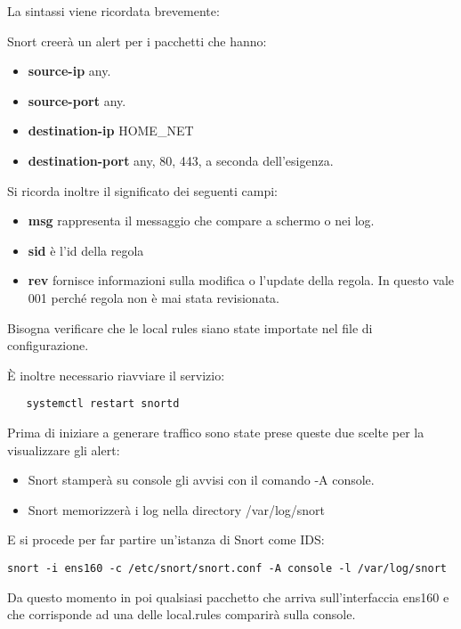La sintassi viene ricordata brevemente:

Snort creerà un alert per i pacchetti che hanno:
\begin{itemize}
    \item \textbf{source-ip} any.
    \item \textbf{source-port} any.
    \item \textbf{destination-ip}  HOME\_NET
    \item \textbf{destination-port} any, 80, 443, a seconda dell'esigenza.
\end{itemize}

Si ricorda inoltre il significato dei seguenti campi:
\begin{itemize}
    \item \textbf{msg} rappresenta il messaggio che compare a schermo o nei log.
    \item \textbf{sid} è l'id della regola
    \item \textbf{rev} fornisce informazioni sulla modifica o l'update della regola. In questo vale 001 perché regola non è mai stata revisionata.
\end{itemize}

Bisogna verificare che le local rules siano state importate nel file di configurazione.

È inoltre necessario riavviare il servizio:

\begin{verbatim}
   systemctl restart snortd
\end{verbatim}

Prima di iniziare a generare traffico sono state prese queste due scelte per la visualizzare gli alert:
\begin{itemize}
    \item Snort stamperà su console gli avvisi con il comando -A console.
    \item Snort memorizzerà i log nella directory /var/log/snort
\end{itemize}

E si procede per far partire un'istanza di Snort come IDS:

\begin{verbatim}
snort -i ens160 -c /etc/snort/snort.conf -A console -l /var/log/snort
\end{verbatim}

Da questo momento in poi qualsiasi pacchetto che arriva sull'interfaccia ens160 e che corrisponde ad una delle local.rules comparirà sulla console.

